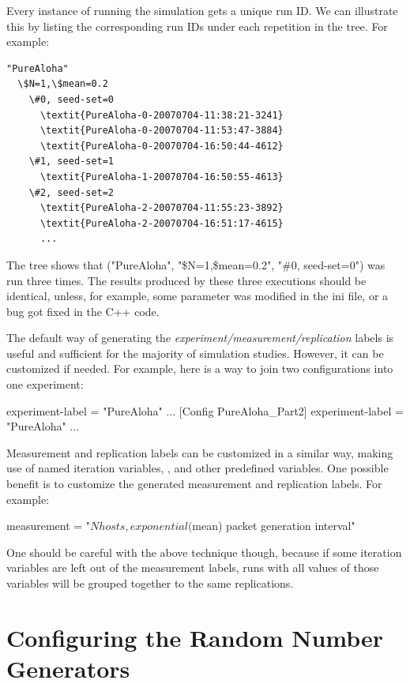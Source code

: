 Every instance of running the simulation gets a unique run ID. We can
illustrate this by listing the corresponding run IDs under each
repetition in the tree. For example:

\begin{Verbatim}[commandchars=\\\{\}]
"PureAloha"
  \$N=1,\$mean=0.2
    \#0, seed-set=0
      \textit{PureAloha-0-20070704-11:38:21-3241}
      \textit{PureAloha-0-20070704-11:53:47-3884}
      \textit{PureAloha-0-20070704-16:50:44-4612}
    \#1, seed-set=1
      \textit{PureAloha-1-20070704-16:50:55-4613}
    \#2, seed-set=2
      \textit{PureAloha-2-20070704-11:55:23-3892}
      \textit{PureAloha-2-20070704-16:51:17-4615}
      ...
\end{Verbatim}

The tree shows that ("PureAloha", "\$N=1,\$mean=0.2", "\#0, seed-set=0")
was run three times. The results produced
by these three executions should be identical, unless, for example,
some parameter was modified in the ini file, or a bug got fixed in the
C++ code.

The default way of generating the \textit{experiment/measurement/replication}
labels is useful and sufficient for the majority of simulation studies.
However, it can be customized if needed. For example, here is a way to join two
configurations into one experiment:

\begin{inifile}
experiment-label = "PureAloha"
...
[Config PureAloha_Part2]
experiment-label = "PureAloha"
...
\end{inifile}

Measurement and replication labels can be customized in a similar way,
making use of named iteration variables, ,
 and other predefined variables. One possible benefit is
to customize the generated measurement and replication labels. For
example:

\begin{inifile}
measurement = "${N} hosts, exponential(${mean}) packet generation interval"
\end{inifile}

One should be careful with the above technique though, because if some
iteration variables are left out of the measurement labels, runs with
all values of those variables will be grouped together to the same
replications.


\section{Configuring the Random Number Generators}
\label{sec:config-sim:rng-config}

